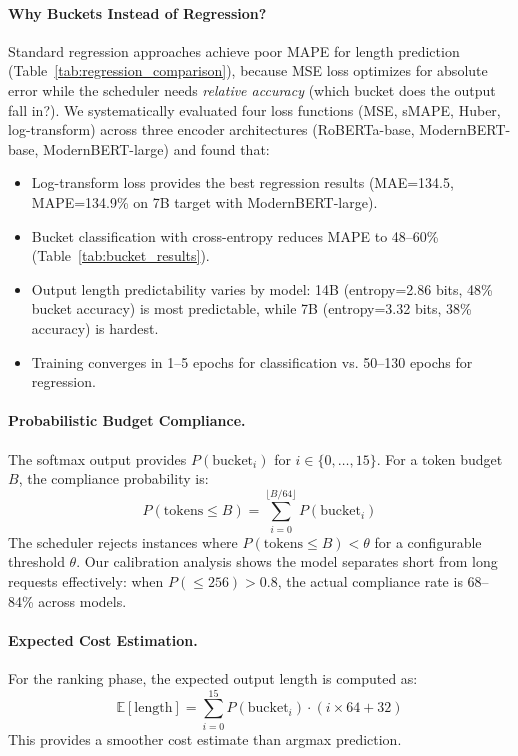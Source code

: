 \documentclass[letterpaper, anonymous, twocolumn, 10pt]{article}
\begin{document}
\paragraph{Why Buckets Instead of Regression?}
Standard regression approaches achieve poor MAPE for length prediction (Table~\ref{tab:regression_comparison}), because MSE loss optimizes for absolute error while the scheduler needs \emph{relative accuracy} (which bucket does the output fall in?). We systematically evaluated four loss functions (MSE, sMAPE, Huber, log-transform) across three encoder architectures (RoBERTa-base, ModernBERT-base, ModernBERT-large) and found that:
\begin{itemize}
    \item Log-transform loss provides the best regression results (MAE=134.5, MAPE=134.9\% on 7B target with ModernBERT-large).
    \item Bucket classification with cross-entropy reduces MAPE to 48--60\% (Table~\ref{tab:bucket_results}).
    \item Output length predictability varies by model: 14B (entropy=2.86 bits, 48\% bucket accuracy) is most predictable, while 7B (entropy=3.32 bits, 38\% accuracy) is hardest.
    \item Training converges in 1--5 epochs for classification vs. 50--130 epochs for regression.
\end{itemize}

\paragraph{Probabilistic Budget Compliance.}
The softmax output provides $P(\text{bucket}_i)$ for $i \in \{0, \ldots, 15\}$. For a token budget $B$, the compliance probability is:
\begin{equation}
P(\text{tokens} \leq B) = \sum_{i=0}^{\lfloor B/64 \rfloor} P(\text{bucket}_i)
\end{equation}
The scheduler rejects instances where $P(\text{tokens} \leq B) < \theta$ for a configurable threshold $\theta$. Our calibration analysis shows the model separates short from long requests effectively: when $P(\leq 256) > 0.8$, the actual compliance rate is 68--84\% across models.

\paragraph{Expected Cost Estimation.}
For the ranking phase, the expected output length is computed as:
\begin{equation}
\mathbb{E}[\text{length}] = \sum_{i=0}^{15} P(\text{bucket}_i) \cdot (i \times 64 + 32)
\end{equation}
This provides a smoother cost estimate than argmax prediction.
\end{document}
